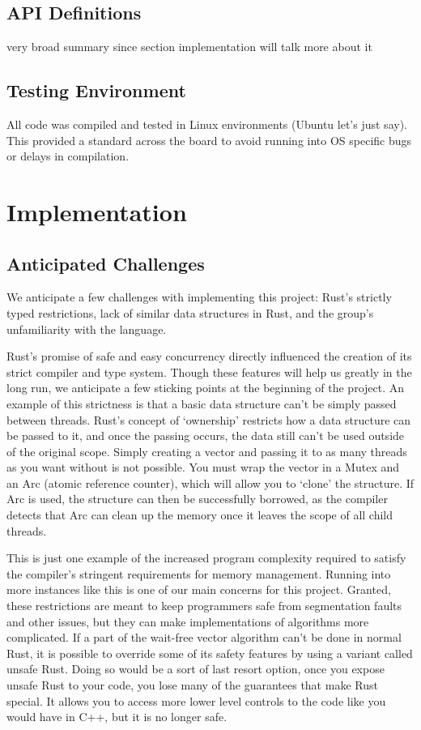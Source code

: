 \documentclass[conference]{IEEEtran}
\begin{document}
    \subsection{API Definitions}
    
    very broad summary since section {implementation} will talk more about it
    
    \subsection{Testing Environment}
    
    All code was compiled and tested in Linux environments (Ubuntu let's just say). This provided a standard across the board to avoid running into OS specific bugs or delays in compilation. 

\section{Implementation}
\subsection{Anticipated Challenges}
We anticipate a few challenges with implementing this project: Rust’s strictly typed restrictions, lack of similar data structures in Rust, and the group’s unfamiliarity with the language.

Rust's promise of safe and easy concurrency directly influenced the creation of its strict compiler and type system. Though these features will help us greatly in the long run, we anticipate a few sticking points at the beginning of the project. An example of this strictness is that a basic data structure can’t be simply passed between threads. Rust's concept of ‘ownership’ restricts how a data structure can be passed to it, and once the passing occurs, the data still can't be used outside of the original scope. Simply creating a vector and passing it to as many threads as you want without is not possible. You must wrap the vector in a Mutex and an Arc (atomic reference counter), which will allow you to ‘clone’ the structure. If Arc is used, the structure can then be successfully borrowed, as the compiler detects that Arc can clean up the memory once it leaves the scope of all child threads. 

This is just one example of the increased program complexity required to satisfy the compiler's stringent requirements for memory management. Running into more instances like this is one of our main concerns for this project. Granted, these restrictions are meant to keep programmers safe from segmentation faults and other issues, but they can make implementations of algorithms more complicated. If a part of the wait-free vector algorithm can’t be done in normal Rust, it is possible to override some of its safety features by using a variant called unsafe Rust. Doing so would be a sort of last resort option, once you expose unsafe Rust to your code, you lose many of the guarantees that make Rust special. It allows you to access more lower level controls to the code like you would have in C++, but it is no longer safe.
\end{document}
